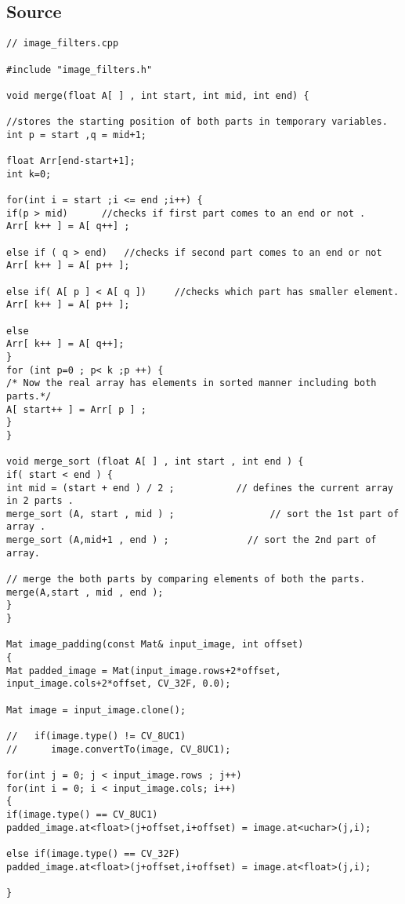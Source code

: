 \subsection{Source}
\begin{lstlisting}
// image_filters.cpp

#include "image_filters.h"

void merge(float A[ ] , int start, int mid, int end) {

//stores the starting position of both parts in temporary variables.
int p = start ,q = mid+1;

float Arr[end-start+1];
int k=0;

for(int i = start ;i <= end ;i++) {
if(p > mid)      //checks if first part comes to an end or not .
Arr[ k++ ] = A[ q++] ;

else if ( q > end)   //checks if second part comes to an end or not
Arr[ k++ ] = A[ p++ ];

else if( A[ p ] < A[ q ])     //checks which part has smaller element.
Arr[ k++ ] = A[ p++ ];

else
Arr[ k++ ] = A[ q++];
}
for (int p=0 ; p< k ;p ++) {
/* Now the real array has elements in sorted manner including both 
parts.*/
A[ start++ ] = Arr[ p ] ;                          
}
}

void merge_sort (float A[ ] , int start , int end ) {
if( start < end ) {
int mid = (start + end ) / 2 ;           // defines the current array in 2 parts .
merge_sort (A, start , mid ) ;                 // sort the 1st part of array .
merge_sort (A,mid+1 , end ) ;              // sort the 2nd part of array.

// merge the both parts by comparing elements of both the parts.
merge(A,start , mid , end );   
}                    
}

Mat image_padding(const Mat& input_image, int offset)
{
Mat padded_image = Mat(input_image.rows+2*offset, input_image.cols+2*offset, CV_32F, 0.0);

Mat image = input_image.clone();

//   if(image.type() != CV_8UC1)
//  	image.convertTo(image, CV_8UC1);

for(int j = 0; j < input_image.rows ; j++)
for(int i = 0; i < input_image.cols; i++)
{
if(image.type() == CV_8UC1)
padded_image.at<float>(j+offset,i+offset) = image.at<uchar>(j,i);

else if(image.type() == CV_32F)
padded_image.at<float>(j+offset,i+offset) = image.at<float>(j,i);

}


\end{lstlisting}
